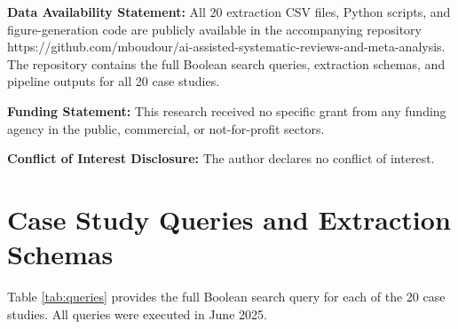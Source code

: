 \documentclass[12pt]{article}
\begin{document}
\textbf{Data Availability Statement:}
All 20 extraction CSV files, Python scripts, and figure-generation code are publicly available in the accompanying repository https://github.com/mboudour/ai-assisted-systematic-reviews-and-meta-analysis. The repository contains the full Boolean search queries, extraction schemas, and pipeline outputs for all 20 case studies.

\textbf{Funding Statement:}
This research received no specific grant from any funding agency in the public, commercial, or not-for-profit sectors.

\textbf{Conflict of Interest Disclosure:}
The author declares no conflict of interest.

\appendix

\section{Case Study Queries and Extraction Schemas}
\label{app:queries}

Table \ref{tab:queries} provides the full Boolean search query for each of the 20 case studies. All queries were executed in June 2025.
\end{document}
